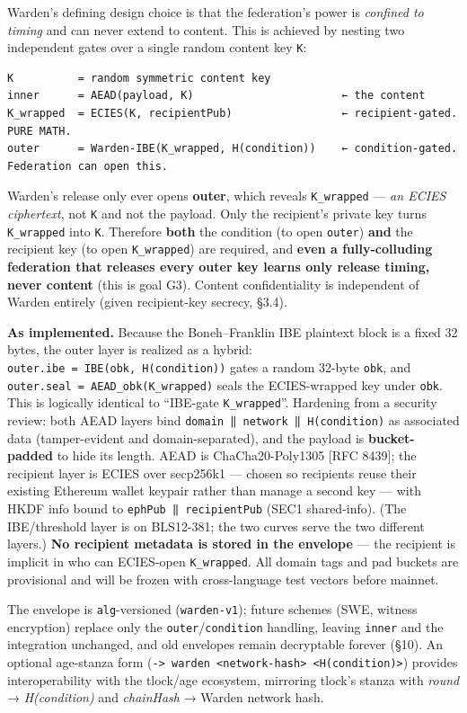 \documentclass[
  11pt,
]{article}
\begin{document}
Warden's defining design choice is that the federation's power is
\emph{confined to timing} and can never extend to content. This is
achieved by nesting two independent gates over a single random content
key \texttt{K}:

\begin{verbatim}
K          = random symmetric content key
inner      = AEAD(payload, K)                       ← the content
K_wrapped  = ECIES(K, recipientPub)                 ← recipient-gated.  PURE MATH.
outer      = Warden-IBE(K_wrapped, H(condition))    ← condition-gated.  Federation can open this.
\end{verbatim}

Warden's release only ever opens \textbf{outer}, which reveals
\texttt{K\_wrapped} --- \emph{an ECIES ciphertext}, not \texttt{K} and
not the payload. Only the recipient's private key turns
\texttt{K\_wrapped} into \texttt{K}. Therefore \textbf{both} the
condition (to open \texttt{outer}) \textbf{and} the recipient key (to
open \texttt{K\_wrapped}) are required, and \textbf{even a
fully-colluding federation that releases every outer key learns only
release timing, never content} (this is goal G3). Content
confidentiality is independent of Warden entirely (given recipient-key
secrecy, §3.4).

\textbf{As implemented.} Because the Boneh--Franklin IBE plaintext block
is a fixed 32 bytes, the outer layer is realized as a hybrid:
\texttt{outer.ibe\ =\ IBE(obk,\ H(condition))} gates a random 32-byte
\texttt{obk}, and \texttt{outer.seal\ =\ AEAD\_obk(K\_wrapped)} seals
the ECIES-wrapped key under \texttt{obk}. This is logically identical to
``IBE-gate \texttt{K\_wrapped}''. Hardening from a security review: both
AEAD layers bind \texttt{domain\ ‖\ network\ ‖\ H(condition)} as
associated data (tamper-evident and domain-separated), and the payload
is \textbf{bucket-padded} to hide its length. AEAD is ChaCha20-Poly1305
{[}RFC 8439{]}; the recipient layer is ECIES over secp256k1 --- chosen
so recipients reuse their existing Ethereum wallet keypair rather than
manage a second key --- with HKDF info bound to
\texttt{ephPub\ ‖\ recipientPub} (SEC1 shared-info). (The IBE/threshold
layer is on BLS12-381; the two curves serve the two different layers.)
\textbf{No recipient metadata is stored in the envelope} --- the
recipient is implicit in who can ECIES-open \texttt{K\_wrapped}. All
domain tags and pad buckets are provisional and will be frozen with
cross-language test vectors before mainnet.

The envelope is \texttt{alg}-versioned (\texttt{warden-v1}); future
schemes (SWE, witness encryption) replace only the
\texttt{outer}/\texttt{condition} handling, leaving \texttt{inner} and
the integration unchanged, and old envelopes remain decryptable forever
(§10). An optional age-stanza form
(\texttt{-\textgreater{}\ warden\ \textless{}network-hash\textgreater{}\ \textless{}H(condition)\textgreater{}})
provides interoperability with the tlock/age ecosystem, mirroring
tlock's stanza with \emph{round} → \emph{H(condition)} and
\emph{chainHash} → Warden network hash.
\end{document}
